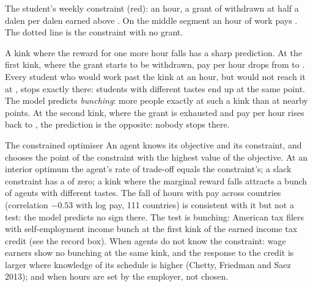 \begin{omfigure}

{\small The student's weekly constraint (red):  an hour, a grant of
 withdrawn at half a dalen per dalen earned above . On the
middle segment an hour of work pays . The dotted line is the
constraint with no grant.}
\end{omfigure}

A kink where the reward for one more hour falls has a sharp prediction.
At the first kink, where the grant starts to be withdrawn, pay per hour
drops from  to . Every student who would work past the kink
at  an hour, but would not reach it at , stops exactly there:
students with different tastes end up at the same point. The model
predicts \emph{bunching}: more people exactly at such a kink than at nearby
points. At the second kink, where the grant is exhausted and pay per hour
rises back to , the prediction is the opposite: nobody stops there.

\begin{model}{The constrained optimiser}
\assumes An agent knows its objective and its constraint, and chooses the
point of the constraint with the highest value of the objective.
\predicts At an interior optimum the agent's rate of trade-off equals the
constraint's; a slack constraint has a  of zero; a kink where
the marginal reward falls attracts a bunch of agents with different tastes.
\tested The fall of hours with pay across countries (correlation $-0.53$
with log pay, 111 countries) is consistent with it but not a test: the model
predicts no sign there. %
The test is bunching: American tax filers with self-employment income bunch at the first kink of
the earned income tax credit (see the record box). %
\breaks When agents do not know the constraint: wage earners show no bunching
at the same kink, and the response to the credit is larger where knowledge of
its schedule is higher (Chetty, Friedman and Saez 2013); %
and when hours are set by the employer, not chosen.
\end{model}

